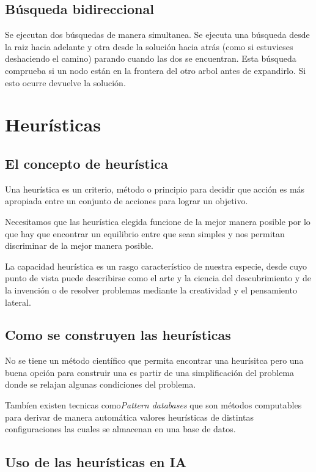 \documentclass[12pt]{article}
\begin{document}
\subsection{Búsqueda bidireccional}

Se ejecutan dos búsquedas de manera simultanea. Se ejecuta una
búsqueda desde la raiz hacia adelante y otra desde la solución hacia
atrás (como si estuvieses deshaciendo el camino) parando cuando las
dos se encuentran. Esta búsqueda comprueba si un nodo están en la
frontera del otro arbol antes de expandirlo. Si esto ocurre devuelve
la solución.


\section{Heurísticas}

\subsection{El concepto de heurística}

Una heurística es un criterio, método o principio para decidir que acción
es más apropiada entre un conjunto de acciones para lograr un
objetivo.

Necesitamos que las heurística elegida funcione de la mejor manera
posible por lo que hay que encontrar un equilibrio entre que sean
simples y nos permitan discriminar de la mejor manera posible.

La capacidad heurística es un rasgo característico de nuestra especie,
desde cuyo punto de vista puede describirse como el arte y la ciencia
del descubrimiento y de la invención o de resolver problemas mediante
la creatividad y el pensamiento lateral.

\subsection{Como se construyen las heurísticas}

No se tiene un método científico que permita encontrar
una heurísitca pero una buena opción para construir una es partir de
una simplificación del problema donde se relajan algunas condiciones
del problema.

Tambíen existen tecnicas como\textit{Pattern databases} que son
métodos computables para derivar de manera automática valores
heurísticas de distintas configuraciones las cuales se almacenan en
una base de datos.

\subsection{Uso de las heurísticas en IA}
\end{document}
